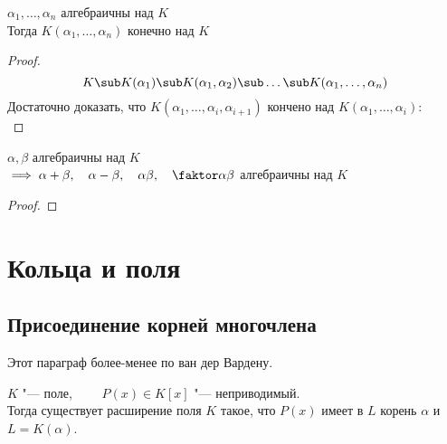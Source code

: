\begin{implication}
	$ \alpha_1, \dots, \alpha_n $ алгебраичны над $ K $ \\
	Тогда $ K(\alpha_1, \dots, \alpha_n) $ конечно над $ K $
\end{implication}

\begin{proof}
	$$ K \sub K(\alpha_1) \sub K(\alpha_1, \alpha_2) \sub \dots \sub K(\alpha_1, \dots, \alpha_n) $$
	Достаточно доказать, что $ K(\alpha_1, \dots, \alpha_i, \alpha_{i + 1}) $ кончено над $ K(\alpha_1, \dots, \alpha_i) $: \\
	\widedots[5cm]
\end{proof}

\begin{implication}
	$ \alpha, \beta $ алгебраичны над $ K $ \\
	$ \implies \alpha + \beta, \quad \alpha - \beta, \quad \alpha \beta, \quad \faktor\alpha\beta $ алгебраичны над $ K $
\end{implication}

\begin{proof}
\end{proof}


\chapter{Кольца и поля}

\section{Присоединение корней многочлена}

Этот параграф более-менее по ван дер Вардену.

\begin{theorem}
	$ K $ "--- поле, $ \qquad P(x) \in K[x] $ "--- неприводимый. \\
	Тогда существует расширение поля $ K $ такое, что $ P(x) $ имеет в $ L $ корень $ \alpha $ и $ L = K(\alpha) $.
\end{theorem}

